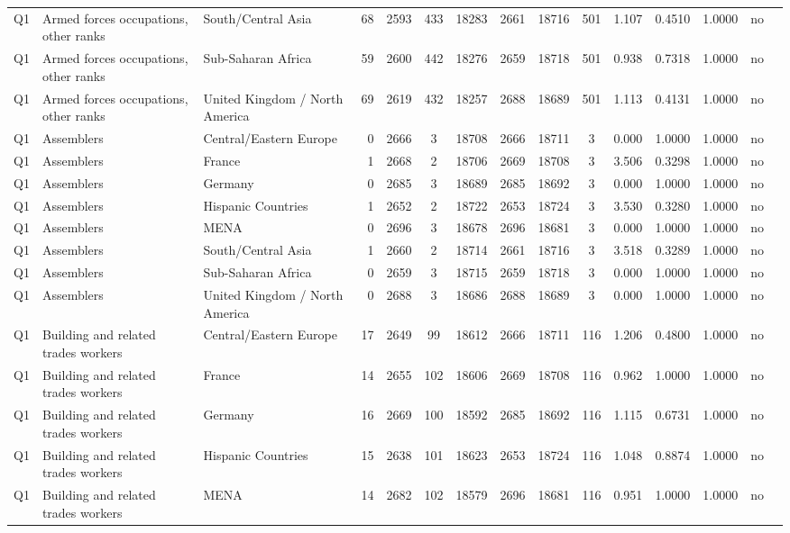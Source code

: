 \begin{longtable}{lllrcccccccccll}
Q1 & Armed forces occupations, other ranks & South/Central Asia & 68 & 2593 & 433 & 18283 & 2661 & 18716 & 501 & 1.107 & 0.4510 & 1.0000 & no \\
Q1 & Armed forces occupations, other ranks & Sub-Saharan Africa & 59 & 2600 & 442 & 18276 & 2659 & 18718 & 501 & 0.938 & 0.7318 & 1.0000 & no \\
Q1 & Armed forces occupations, other ranks & United Kingdom / North America & 69 & 2619 & 432 & 18257 & 2688 & 18689 & 501 & 1.113 & 0.4131 & 1.0000 & no \\
Q1 & Assemblers & Central/Eastern Europe & 0 & 2666 & 3 & 18708 & 2666 & 18711 & 3 & 0.000 & 1.0000 & 1.0000 & no \\
Q1 & Assemblers & France & 1 & 2668 & 2 & 18706 & 2669 & 18708 & 3 & 3.506 & 0.3298 & 1.0000 & no \\
Q1 & Assemblers & Germany & 0 & 2685 & 3 & 18689 & 2685 & 18692 & 3 & 0.000 & 1.0000 & 1.0000 & no \\
Q1 & Assemblers & Hispanic Countries & 1 & 2652 & 2 & 18722 & 2653 & 18724 & 3 & 3.530 & 0.3280 & 1.0000 & no \\
Q1 & Assemblers & MENA & 0 & 2696 & 3 & 18678 & 2696 & 18681 & 3 & 0.000 & 1.0000 & 1.0000 & no \\
Q1 & Assemblers & South/Central Asia & 1 & 2660 & 2 & 18714 & 2661 & 18716 & 3 & 3.518 & 0.3289 & 1.0000 & no \\
Q1 & Assemblers & Sub-Saharan Africa & 0 & 2659 & 3 & 18715 & 2659 & 18718 & 3 & 0.000 & 1.0000 & 1.0000 & no \\
Q1 & Assemblers & United Kingdom / North America & 0 & 2688 & 3 & 18686 & 2688 & 18689 & 3 & 0.000 & 1.0000 & 1.0000 & no \\
Q1 & Building and related trades workers & Central/Eastern Europe & 17 & 2649 & 99 & 18612 & 2666 & 18711 & 116 & 1.206 & 0.4800 & 1.0000 & no \\
Q1 & Building and related trades workers & France & 14 & 2655 & 102 & 18606 & 2669 & 18708 & 116 & 0.962 & 1.0000 & 1.0000 & no \\
Q1 & Building and related trades workers & Germany & 16 & 2669 & 100 & 18592 & 2685 & 18692 & 116 & 1.115 & 0.6731 & 1.0000 & no \\
Q1 & Building and related trades workers & Hispanic Countries & 15 & 2638 & 101 & 18623 & 2653 & 18724 & 116 & 1.048 & 0.8874 & 1.0000 & no \\
Q1 & Building and related trades workers & MENA & 14 & 2682 & 102 & 18579 & 2696 & 18681 & 116 & 0.951 & 1.0000 & 1.0000 & no \\

\end{longtable}

